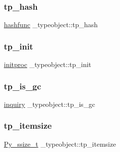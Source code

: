 \subsubsection{\texorpdfstring{tp\_hash}{tp\_hash}}
{\footnotesize\ttfamily \mbox{\hyperlink{_python27_2object_8h_ab4f13c4663a5e0ae8a2b829798dae462}{hashfunc}} \+\_\+typeobject\+::tp\+\_\+hash}

\mbox{\label{struct__typeobject_ad083cb6eb85208fa7db2ec355df484e6}} 
\subsubsection{\texorpdfstring{tp\_init}{tp\_init}}
{\footnotesize\ttfamily \mbox{\hyperlink{_python27_2object_8h_a20bb5805aeb5c7590e02a24a857bd15d}{initproc}} \+\_\+typeobject\+::tp\+\_\+init}

\mbox{\label{struct__typeobject_adef285ef9efe163de1c57925451f2b5c}} 
\subsubsection{\texorpdfstring{tp\_is\_gc}{tp\_is\_gc}}
{\footnotesize\ttfamily \mbox{\hyperlink{_python27_2object_8h_a2614f58e24895fe4693c83466d7f46e8}{inquiry}} \+\_\+typeobject\+::tp\+\_\+is\+\_\+gc}

\mbox{\label{struct__typeobject_aa2f823359e194b776476771c4b4a0a99}} 
\subsubsection{\texorpdfstring{tp\_itemsize}{tp\_itemsize}}
{\footnotesize\ttfamily \mbox{\hyperlink{pyport_8h_ac6411a3dfda9ac6feb9e8d859b1184bc}{Py\+\_\+ssize\+\_\+t}} \+\_\+typeobject\+::tp\+\_\+itemsize}

\mbox{\label{struct__typeobject_aa41b38a7f4b64302d111ed8f31c0fc8a}} 
